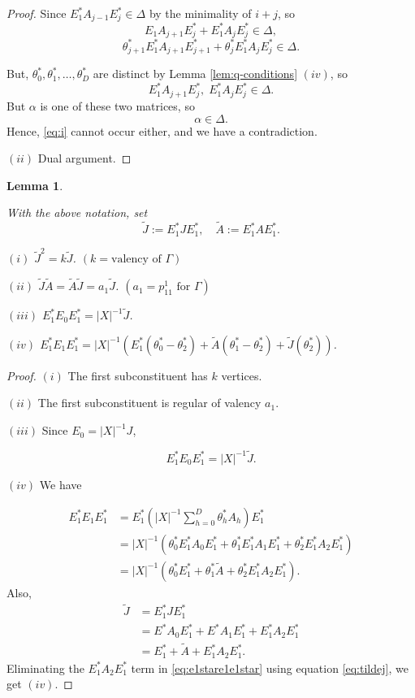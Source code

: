 \documentclass[
]{book}
\newtheorem{lemma}{Lemma}[chapter]
\theoremstyle{definition}
\theoremstyle{definition}
\theoremstyle{definition}
\theoremstyle{definition}
\theoremstyle{remark}
\begin{document}
\begin{proof}
Since \(E^*_1A_{j-1}E^*_j\in \Delta\) by the minimality of \(i+j\), so
\[E_1A_{j+1}E^*_j + E^*_1A_jE^*_j \in \Delta,\]
\[\theta^*_{j+1}E^*_1A_{j+1}E^*_{j+1} + \theta^*_jE^*_1A_jE^*_j \in \Delta.\]

But, \(\theta^*_0, \theta^*_1, \ldots, \theta^*_D\) are distinct by Lemma \ref{lem:q-conditions} \((iv)\),
so
\[E^*_1A_{j+1}E^*_j, \; E^*_1A_jE^*_j\in \Delta.\]
But \(\alpha\) is one of these two matrices, so
\[\alpha \in \Delta.\]
Hence, \eqref{eq:i} cannot occur either, and we have a contradiction.

\((ii)\) Dual argument.

\end{proof}

\begin{lemma}
\protect\hypertarget{lem:tildej-tildea}{}\label{lem:tildej-tildea}

With the above notation, set
\[\tilde{J}:= E^*_1JE^*_1, \quad \tilde{A}:= E^*_1AE^*_1.\]

\((i)\) \(\tilde{J}^2 = k\tilde{J}\). \((k = \text{valency of $\Gamma$})\)

\((ii)\) \(\tilde{J}\tilde{A} = \tilde{A}\tilde{J} = a_1\tilde{J}\). \((a_1 = p^{1}_{11} \text{ for } \Gamma)\)

\((iii)\) \(E_1^*E_0E^*_1 = |X|^{-1}\tilde{J}\).

\((iv)\) \(E^*_1E_1E^*_1 = |X|^{-1}(E^*_1(\theta^*_0-\theta^*_2)+\tilde{A}(\theta^*_{1}-\theta^*_2)+\tilde{J}(\theta^*_2))\).

\end{lemma}

\begin{proof}
\leavevmode

\((i)\) The first subconstituent has \(k\) vertices.

\((ii)\) The first subconstituent is regular of valency \(a_1\).

\((iii)\) Since \(E_0 = |X|^{-1}J\),

\[E^*_1E_0E^*_1 = |X|^{-1}\tilde{J}.\]

\((iv)\) We have

\begin{align}
E^*_1E_1E^*_1 & = E^*_1\left(|X|^{-1}\sum_{h=0}^D\theta^*_h A_h\right)E^*_1\\
& = |X|^{-1}(\theta^*_0E^*_1A_0E^*_1 + \theta^*_1E^*_1A_1E^*_1 + \theta^*_2E^*_1A_2E^*_1)\\
& = |X|^{-1}(\theta^*_0E^*_1 + \theta^*_1\tilde{A} + \theta^*_2E^*_1A_2E^*_1). \label{eq:e1stare1e1star}
\end{align}
Also,
\begin{align}
\tilde{J} & = E^*_1JE^*_1\\
& = E^*A_0E^*_1 + E^*A_1E^*_1 + E^*_1A_2E^*_1\\
& = E^*_1 + \tilde{A} + E^*_1A_2E^*_1. \label{eq:tildej}
\end{align}
Eliminating the \(E^*_1A_2E^*_1\) term in \eqref{eq:e1stare1e1star} using equation \eqref{eq:tildej}, we get \((iv)\).

\end{proof}
\end{document}
